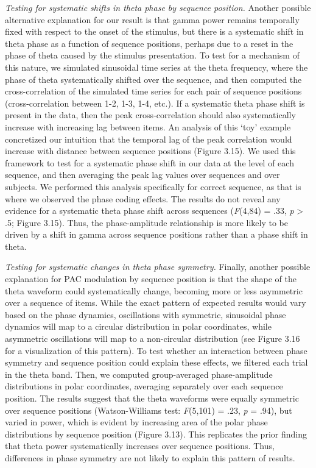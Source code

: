 \emph{Testing for systematic shifts in theta phase by sequence
position.} Another possible alternative explanation for our result is
that gamma power remains temporally fixed with respect to the onset of
the stimulus, but there is a systematic shift in theta phase as a
function of sequence positions, perhaps due to a reset in the phase of
theta caused by the stimulus presentation. To test for a mechanism of
this nature, we simulated sinusoidal time series at the theta frequency,
where the phase of theta systematically shifted over the sequence, and
then computed the cross-correlation of the simulated time series for
each pair of sequence positions (cross-correlation between 1-2, 1-3,
1-4, etc.). If a systematic theta phase shift is present in the data,
then the peak cross-correlation should also systematically increase with
increasing lag between items. An analysis of this `toy' example
concretized our intuition that the temporal lag of the peak correlation
would increase with distance between sequence positions (Figure 3.15).
We used this framework to test for a systematic phase shift in our data
at the level of each sequence, and then averaging the peak lag values
over sequences and over subjects. We performed this analysis
specifically for correct sequence, as that is where we observed the
phase coding effects. The results do not reveal any evidence for a
systematic theta phase shift across sequences (\emph{F}(4,84) = .33,
\emph{p} \textgreater{} .5; Figure 3.15). Thus, the phase-amplitude
relationship is more likely to be driven by a shift in gamma across
sequence positions rather than a phase shift in theta.

\emph{Testing for systematic changes in theta phase symmetry.} Finally,
another possible explanation for PAC modulation by sequence position is
that the shape of the theta waveform could systematically change,
becoming more or less asymmetric over a sequence of items. While the
exact pattern of expected results would vary based on the phase
dynamics, oscillations with symmetric, sinusoidal phase dynamics will
map to a circular distribution in polar coordinates, while asymmetric
oscillations will map to a non-circular distribution (see Figure 3.16
for a visualization of this pattern). To test whether an interaction
between phase symmetry and sequence position could explain these
effects, we filtered each trial in the theta band. Then, we computed
group-averaged phase-amplitude distributions in polar coordinates,
averaging separately over each sequence position. The results suggest
that the theta waveforms were equally symmetric over sequence positions
(Watson-Williams test: \emph{F}(5,101) = .23, \emph{p} = .94), but
varied in power, which is evident by increasing area of the polar phase
distributions by sequence position (Figure 3.13). This replicates the
prior finding that theta power systematically increases over sequence
positions. Thus, differences in phase symmetry are not likely to explain
this pattern of results.

